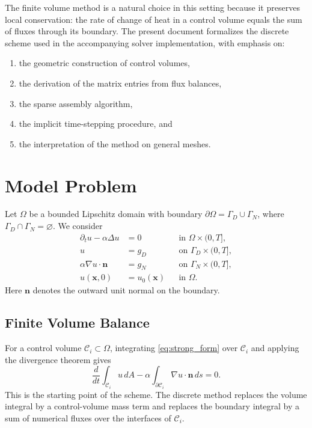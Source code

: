\documentclass[11pt]{article}
\theoremstyle{plain}
\theoremstyle{definition}
\theoremstyle{remark}
\numberwithin{equation}{section}
\begin{document}
The finite volume method is a natural choice in this setting because it preserves local conservation: the rate of change of heat in a control volume equals the sum of fluxes through its boundary. The present document formalizes the discrete scheme used in the accompanying solver implementation, with emphasis on:
\begin{enumerate}[label=\arabic*.]
\item the geometric construction of control volumes,
\item the derivation of the matrix entries from flux balances,
\item the sparse assembly algorithm,
\item the implicit time-stepping procedure, and
\item the interpretation of the method on general meshes.
\end{enumerate}

\section{Model Problem}
Let $\Omega$ be a bounded Lipschitz domain with boundary $\partial \Omega = \Gamma_D \cup \Gamma_N$, where $\Gamma_D \cap \Gamma_N = \varnothing$. We consider
\begin{align}
\partial_t u - \alpha \Delta u &= 0 && \text{in } \Omega \times (0,T], \label{eq:strong_form} \\
u &= g_D && \text{on } \Gamma_D \times (0,T], \label{eq:dirichlet_bc} \\
\alpha \nabla u \cdot \bm{n} &= g_N && \text{on } \Gamma_N \times (0,T], \label{eq:neumann_bc} \\
u(\bm{x},0) &= u_0(\bm{x}) && \text{in } \Omega. \label{eq:initial_cond}
\end{align}
Here $\bm{n}$ denotes the outward unit normal on the boundary.

\subsection{Finite Volume Balance}
For a control volume $\mathcal{C}_i \subset \Omega$, integrating \cref{eq:strong_form} over $\mathcal{C}_i$ and applying the divergence theorem gives
\begin{equation}
\label{eq:fvm_balance}
\frac{d}{dt} \int_{\mathcal{C}_i} u \, dA
- \alpha \int_{\partial \mathcal{C}_i} \nabla u \cdot \bm{n} \, ds = 0.
\end{equation}
This is the starting point of the scheme. The discrete method replaces the volume integral by a control-volume mass term and replaces the boundary integral by a sum of numerical fluxes over the interfaces of $\mathcal{C}_i$.
\end{document}
